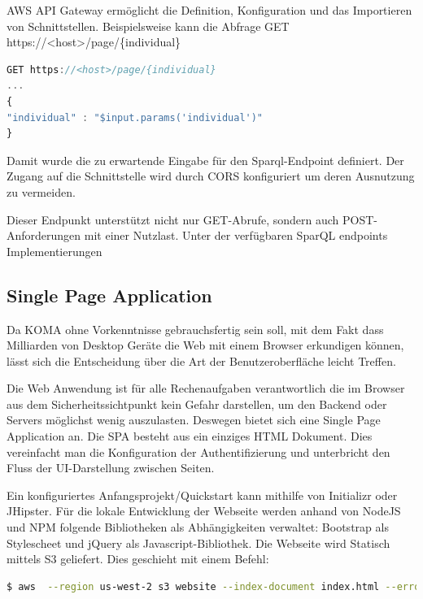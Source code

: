 \documentclass[
12pt,
english,
ngerman,
headsepline,
twoside,
openright,
numbers=noenddot,version=first
]{scrreprt}
\begin{document}
AWS API Gateway ermöglicht die Definition, Konfiguration und das Importieren von Schnittstellen. Beispielsweise kann die Abfrage GET https://<host>/page/\{individual\} 

\begin{lstlisting}[language=Javascript,caption={API Gateway Request Mapping Template},label={lst:map-template}]
GET https://<host>/page/{individual} 
...
{
"individual" : "$input.params('individual')"
}
\end{lstlisting}

Damit wurde die zu erwartende Eingabe für den Sparql-Endpoint definiert. Der Zugang auf die Schnittstelle wird durch CORS konfiguriert um deren Ausnutzung zu vermeiden. 

Dieser Endpunkt unterstützt nicht nur GET-Abrufe, sondern auch POST-Anforderungen mit einer Nutzlast.
Unter der verfügbaren SparQL endpoints Implementierungen



\subsection{Single Page Application}
\label{sec:spa}

Da KOMA ohne Vorkenntnisse gebrauchsfertig sein soll, mit dem Fakt dass Milliarden von Desktop Geräte die Web mit einem Browser erkundigen können, lässt sich die Entscheidung über die Art der Benutzeroberfläche leicht Treffen.

Die Web Anwendung ist für alle Rechenaufgaben verantwortlich die im Browser aus dem Sicherheitssichtpunkt kein Gefahr darstellen, um den Backend oder Servers möglichst wenig auszulasten. Deswegen bietet sich eine Single Page Application an. 
Die SPA besteht aus ein einziges HTML Dokument. Dies vereinfacht man die Konfiguration der Authentifizierung und unterbricht den Fluss der UI-Darstellung zwischen Seiten.

Ein konfiguriertes Anfangsprojekt/Quickstart kann mithilfe von Initializr\cite{Initializr} oder JHipster\cite{Jhipster}. Für die lokale Entwicklung der Webseite werden anhand von NodeJS und NPM folgende Bibliotheken als Abhängigkeiten verwaltet: Bootstrap als Stylescheet und jQuery als Javascript-Bibliothek.
Die Webseite wird Statisch mittels S3 geliefert. Dies geschieht mit einem Befehl: 
\begin{lstlisting}[language=BASH, caption={Webseite veröffentlichen}]
$ aws  --region us-west-2 s3 website --index-document index.html --error-document error.html 's3://koma.thb.de'
\end{lstlisting} 
\end{document}
